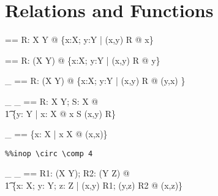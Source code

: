 \documentclass{article}
\begin{document}
\section{Relations and Functions}



\begin{axdef}[X,Y]
   \dom == \lambda R: \assumed X \rel Y @ 
               \{x:\assumed X; y:\assumed Y | (x,y) \in R @ x\}
\end{axdef}

\begin{axdef}[X,Y]
   \ran == \lambda R: \assumed (X \rel Y) @ 
               \{x:\assumed X; y:\assumed Y | (x,y) \in R @ y\}
\end{axdef}



\begin{axdef}[X,Y]
   \_ \inv == \lambda R: \assumed (X \rel Y) @ 
               \{x:\assumed X; y:\assumed Y | (x,y) \in R @ (y,x) \}
\end{axdef}



\begin{axdef}[X,Y]
   \_ \limg \_ \rimg == 
      \lambda R: \assumed X \rel Y; S: \assumed \power X @ \\\t1
        \{y: \assumed Y |
               \exists x: \assumed X @ x \in S \land (x,y) \in R\}
\end{axdef}




\begin{axdef}[X]
   \id \_ == \{x: \assumed X | x \in X @ (x,x)\}
\end{axdef}



\begin{verbatim}
%%inop \circ \comp 4
\end{verbatim}

\begin{axdef}[X,Y,Z]
   \_ \comp \_ == 
     \lambda R1: \assumed (X \rel Y); R2: \assumed (Y \rel Z) @ \\\t1
       \{x: \assumed X; y: \assumed Y; z: \assumed Z |
            (x,y) \in R1; (y,z) \in R2 @ (x,z)\}
\end{axdef}
\end{document}
